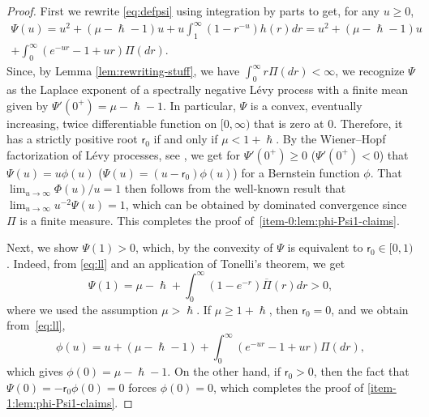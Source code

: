 \documentclass[JEP,XML,SOM,Unicode]{cedram}
\theoremstyle{plain}
\theoremstyle{definition}
\newcommand{\tet}{{\mathsf{r}_0}}
\let\h\hslash
\let\mo\mu
\begin{document}
\begin{proof}
First we rewrite \eqref{eq:defpsi} using integration by parts to get, for any $u\geq0$,
\begin{multline}
\label{eq:ll}
\Psi(u) = u^2+(\mo-\h-1)u+u\int_1^\infty (1-r^{-u})h(r)dr = u^2+(\mo-\h-1)u\\[-5pt]
+ \int_0^\infty (e^{-ur}-1+ur)\Pi(dr).
\end{multline}
Since, by Lemma \ref{lem:rewriting-stuff}, we have $\int_0^\infty r\Pi(dr) < \infty$, we recognize $\Psi$ as the Laplace exponent of a spectrally negative Lévy process with a finite mean given by $\Psi'(0^+)=\mu-\h-1$. In particular, $\Psi$ is a convex, eventually increasing, twice differentiable function on $[0,\infty)$ that is zero at $0$. Therefore, it has a strictly positive root $\tet$ if and only if $\mo < 1+\h$. By the Wiener--Hopf factorization of Lévy processes, see \eg \cite[Chap.\,6.4]{Kyprianou2014}, we get for $\Psi'(0^+) \geq 0$ (\resp $\Psi'(0^+) < 0$) that $\Psi(u) = u\phi(u)$ (\resp $\Psi(u) = (u-\tet)\phi(u)$) for a Bernstein function $\phi$. That $\lim_{u \to \infty} \Phi(u)/u = 1$ then follows from the well-known result that $\lim_{u \to \infty} u^{-2}\Psi(u) = 1$, which can be obtained by dominated convergence since $\Pi$ is a finite measure. This completes the proof of~\eqref{item-0:lem:phi-Psi1-claims}.

Next, we show $\Psi(1) > 0$, which, by the convexity of $\Psi$ is equivalent to $\tet \in [0,1)$. Indeed, from \eqref{eq:ll} and an application of Tonelli's theorem, we get
\begin{equation*}
\Psi(1) = \mo-\h + \int_0^\infty (1-e^{-r})\overline{\Pi}(r)dr > 0,
\end{equation*}
where we used the assumption $\mo > \h$. If $\mo \geq 1 + \h$, then $\tet = 0$, and we obtain from~\eqref{eq:ll},
\begin{equation*}
\phi(u) = u+(\mo-\h-1)+ \int_0^\infty (e^{-ur}-1+ur)\Pi(dr),
\end{equation*}
which gives $\phi(0) = \mo - \h - 1$. On the other hand, if $\tet > 0$, then the fact that $\Psi(0)=-\tet\phi(0) = 0$ forces $\phi(0)=0$, which completes the proof of \eqref{item-1:lem:phi-Psi1-claims}.


\end{proof}
\end{document}
